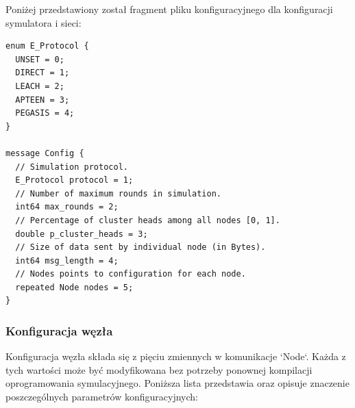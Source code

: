 \documentclass[a4paper,12pt,twoside,openany]{report}
\begin{document}
Poniżej przedstawiony został fragment pliku konfiguracyjnego dla konfiguracji symulatora i sieci:

\begin{lstlisting}
enum E_Protocol {
  UNSET = 0;
  DIRECT = 1;
  LEACH = 2;
  APTEEN = 3;
  PEGASIS = 4;
}

message Config {
  // Simulation protocol.
  E_Protocol protocol = 1;
  // Number of maximum rounds in simulation. 
  int64 max_rounds = 2;
  // Percentage of cluster heads among all nodes [0, 1].
  double p_cluster_heads = 3;
  // Size of data sent by individual node (in Bytes).
  int64 msg_length = 4;
  // Nodes points to configuration for each node.
  repeated Node nodes = 5;
}
\end{lstlisting}

\subsubsection{Konfiguracja węzła}

Konfiguracja węzła składa się z pięciu zmiennych w komunikacje `Node`. Każda z tych wartości może być modyfikowana bez potrzeby
ponownej kompilacji oprogramowania symulacyjnego. Poniższa lista przedstawia oraz opisuje znaczenie poszczególnych parametrów konfiguracyjnych:
\end{document}
